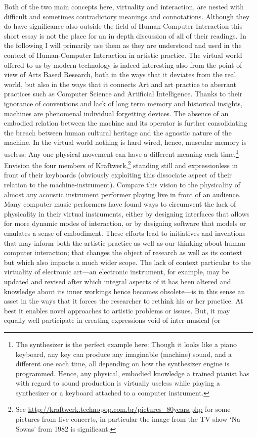 Both of the two main concepts here, virtuality and interaction, are nested with difficult and sometimes contradictory meanings and connotations. Although they do have significance also outside the field of Human-Computer Interaction this short essay is not the place for an in depth discussion of all of their readings. In the following I will primarily use them as they are understood and used in the context of Human-Computer Interaction in artistic practice. The virtual world offered to us by modern technology is indeed interesting also from the point of view of Arts Based Research, both in the ways that it deviates from the real world, but also in the ways that it connects Art and art practice to aberrant practices such as Computer Science and Artificial Intelligence. Thanks to their ignorance of conventions and lack of long term memory and historical insights, machines are phenomenal individual forgetting devices. \parencite{miller04} The absence of an embodied relation between the machine and its operator is further consolidating the breach between human cultural heritage and the agnostic nature of the machine. In the virtual world nothing is hard wired, hence, muscular memory is useless: Any one physical movement can have a different meaning each time.\footnote{The synthesizer is the perfect example here: Though it looks like a piano keyboard, any key can produce any imaginable (machine) sound, and a different one each time, all depending on how the synthesizer engine is programmed. Hence, any physical, embodied knowledge a trained pianist has with regard to sound production is virtually useless while playing a synthesizer or a keyboard attached to a computer instrument.} Envision the four members of Kraftwerk,\footnote{See \url{http://kraftwerk.technopop.com.br/pictures\_80years.php} for some pictures from live concerts, in particular the image from the TV show `Na Sowas' from 1982 is significant.} standing still and expressionless in front of their keyboards (obviously exploiting this dissociate aspect of their relation to the machine-instrument). Compare this vision to the physicality of almost any acoustic instrument performer playing live in front of an audience. Many computer music performers have found ways to circumvent the lack of physicality in their virtual instruments, either by designing interfaces that allows for more dynamic modes of interaction, or by designing software that models or emulates a sense of embodiment. These efforts lead to initiatives and inventions that may inform both the artistic practice as well as our thinking about human-computer interaction; that changes the object of research as well as its context but which also impacts a much wider scope. The lack of context particular to the virtuality of electronic art---an electronic instrument, for example, may be updated and revised after which integral aspects of it has been altered and knowledge about its inner workings hence becomes obsolete---is in this sense an asset in the ways that it forces the researcher to rethink his or her practice. \parencite[This may equally well be a frustration as is described in][]{ostertag02} At best it enables novel approaches to artistic problems or issues. But, it may equally well participate in creating expressions void of inter-musical (or 